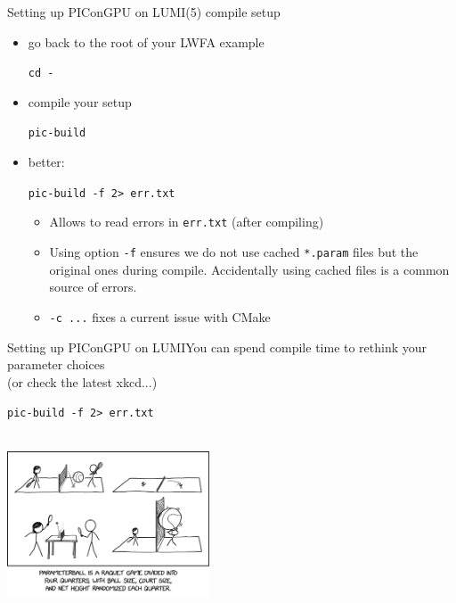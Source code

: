 \documentclass[
  aspectratio=169,
  10pt
]{beamer}
\newcommand{\terminal}[1]{\par\noindent\colorbox{shadecolor}
{\parbox{\dimexpr\textwidth-2\fboxsep\relax}{\texttt{#1}}}}
\begin{document}
\begin{frame}[t,fragile]{Setting up PIConGPU on LUMI}{(5) compile setup}

\begin{itemize}
    \item go back to the root of your LWFA example 
    \terminal{cd -}
    \item compile your setup
    \terminal{pic-build }
    \item better: 
    \terminal{pic-build  -f 2> err.txt}
    \begin{itemize}
        \item Allows to read errors in \texttt{err.txt} (after compiling)
        \item Using option \texttt{-f} ensures we do not use cached \texttt{*.param} files but the original ones during compile.
            Accidentally using cached files is a common source of errors.
        \item \texttt{-c ...} fixes a current issue with CMake

    \end{itemize}
    \end{itemize}
\end{frame}



\begin{frame}[t,fragile]{Setting up PIConGPU on LUMI}{You can spend compile time to rethink your parameter choices\\(or check the latest xkcd...)}
\begin{center}
    \Large
    \terminal{pic-build -f 2> err.txt}\\
    \vspace{\baselineskip}
    \includegraphics[width=0.45\textwidth]{images/parameterball_2x_xkcd-2852.png}
\end{center}
\end{frame}
\end{document}
